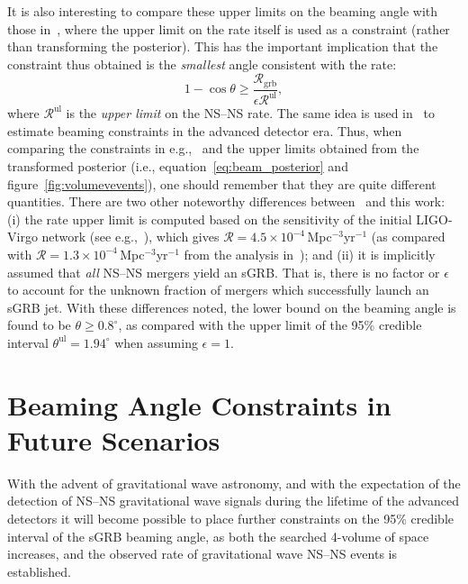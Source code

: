 \documentclass[twocolumn,nofootinbib]{revtex4-1}
\newcommand{\grbrate}{{{\mathcal R}_{\mathrm{grb}}}}
\newcommand{\cbcrate}{{{\mathcal R}}}
\newcommand{\BNS}{\ac{NS}--\ac{NS}\xspace}
\begin{document}
It is also interesting to compare these upper limits on the beaming
angle with those in~\cite{2013PhRvL.111r1101C}, where the upper limit
on the rate itself is used as a constraint (rather than transforming
the posterior).  This has the important implication that the
constraint thus obtained is the \emph{smallest} angle consistent with
the rate:
%
\begin{equation}
    1 - \cos \theta \geq \frac{\grbrate}{\epsilon \cbcrate^{\mathrm{ul}}},
\end{equation}
%
where $\cbcrate^{\mathrm{ul}}$ is the \emph{upper limit} on the \BNS
rate.  The same idea is used in~\cite{Clark:2014jpa} to estimate
beaming constraints in the advanced detector era.  Thus, when
comparing the constraints in e.g.,~\cite{2013PhRvL.111r1101C} and the
upper limits obtained from the transformed posterior (i.e.,
equation~\ref{eq:beam_posterior} and figure~\ref{fig:volumevevents}), one
should remember that they are quite different quantities.  There are
two other noteworthy differences between~\cite{2013PhRvL.111r1101C}
and this work: (i) the rate upper limit is computed based on the
sensitivity of the initial LIGO-Virgo network (see
e.g.,~\cite{BradyFairhurst08}), which gives $\cbcrate=4.5\times
10^{-4}$\,Mpc$^{-3}$yr$^{-1}$ (as compared with $\cbcrate=1.3 \times
10^{-4}$\,Mpc$^{-3}$yr$^{-1}$ from the analysis
in~\cite{Colaboration:2011np}); and (ii) it is implicitly assumed that
\emph{all} \BNS mergers yield an \ac{sGRB}.  That is, there is no
factor or $\epsilon$ to account for the unknown fraction of mergers
which successfully launch an \ac{sGRB} jet.  With these differences
noted, the lower bound on the beaming angle is found to be $\theta
\geq 0.8^{\circ}$, as compared with the upper limit of the 95\%
credible interval $\theta^{\mathrm{ul}}=1.94^{\circ}$ when assuming
$\epsilon=1$.


\section{Beaming Angle Constraints in Future Scenarios}
\label{sec:future}
With the advent of gravitational wave astronomy, and with the
expectation of the detection of \BNS gravitational wave signals during
the lifetime of the advanced detectors it will become possible to
place further constraints on the 95\% credible interval of the sGRB
beaming angle, as both the searched 4-volume of space increases, and
the observed rate of gravitational wave \BNS events is established.
\end{document}
